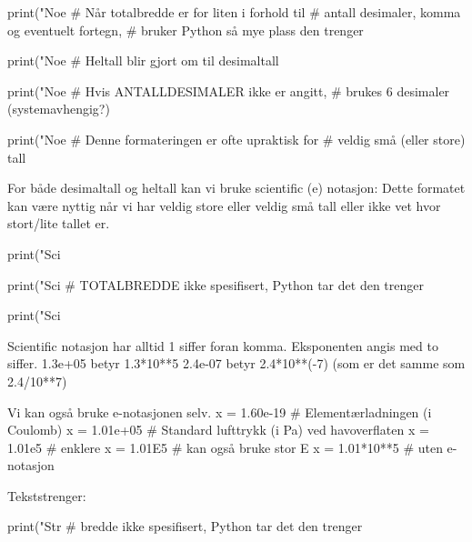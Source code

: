 {print("Noe %
                                     # Når totalbredde er for liten i forhold til 
                                     # antall desimaler, komma og eventuelt fortegn, 
                                     # bruker Python så mye plass den trenger

print("Noe %
                                     # Heltall blir gjort om til desimaltall

print("Noe %
                                     # Hvis ANTALLDESIMALER ikke er angitt, 
                                     # brukes 6 desimaler (systemavhengig?) 

print("Noe %
                                     # Denne formateringen er ofte upraktisk for 
                                     # veldig små (eller store) tall



For både desimaltall og heltall kan vi bruke scientific (e) notasjon: 
Dette formatet kan være nyttig når vi har veldig store eller veldig små tall 
eller ikke vet hvor stort/lite tallet er. 

print("Sci %

print("Sci %
                                         # TOTALBREDDE ikke spesifisert, Python tar det den trenger

print("Sci %

Scientific notasjon har alltid 1 siffer foran komma.
Eksponenten angis med to siffer.
1.3e+05 betyr 1.3*10**5
2.4e-07 betyr 2.4*10**(-7)   (som er det samme som 2.4/10**7)

Vi kan også bruke e-notasjonen selv.
x = 1.60e-19    # Elementærladningen (i Coulomb) 
x = 1.01e+05    # Standard lufttrykk (i Pa) ved havoverflaten 
x = 1.01e5      # enklere
x = 1.01E5      # kan også bruke stor E
x = 1.01*10**5  # uten e-notasjon


Tekststrenger: %

print("Str %
                                  # bredde ikke spesifisert, Python tar det den trenger

}

